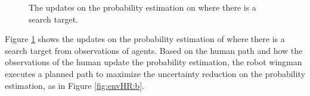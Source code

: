 \documentclass[12pt]{article}
\begin{document}
\begin{figure} 
  \centering 
  \caption{The updates on the probability estimation on where there is a search target.} 
  \label{fig:envHR} %
\end{figure}

Figure \ref{fig:envHR} shows the updates on the probability estimation of where there is a search target from observations of agents.
Based on the human path and how the observations of the human update the probability estimation, the robot wingman executes a planned path to maximize the uncertainty reduction on the probability estimation, as in Figure \ref{fig:envHR:b}.
\end{document}
